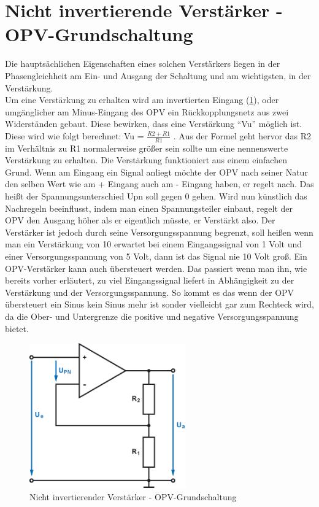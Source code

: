 \section{Nicht invertierende Verstärker - OPV-Grundschaltung}\label{sec:3.5}
Die hauptsächlichen Eigenschaften eines solchen Verstärkers liegen in der Phasengleichheit am Ein- und Ausgang der Schaltung und am wichtigsten, in der Verstärkung. \\
Um eine Verstärkung zu erhalten wird am invertierten Eingang (\ref{fig:3.5.1}), oder umgänglicher am Minus-Eingang des OPV ein Rückkopplungsnetz aus zwei Widerständen gebaut.
Diese bewirken, dass eine Verstärkung \enquote{Vu} möglich ist.
Diese wird wie folgt berechnet: Vu = $\frac{R2+R1}{R1}$ .
Aus der Formel geht hervor das R2 im Verhältnis zu R1 normalerweise größer sein sollte um eine nennenswerte Verstärkung zu erhalten.
Die Verstärkung funktioniert aus einem einfachen Grund.
Wenn am Eingang ein Signal anliegt möchte der OPV nach seiner Natur den selben Wert wie am + Eingang auch am - Eingang haben, er regelt nach.
Das heißt der Spannungsunterschied Upn soll gegen 0 gehen.
Wird nun künstlich das Nachregeln beeinflusst, indem man einen Spannungsteiler einbaut, regelt der OPV den Ausgang höher als er eigentlich müsste, er Verstärkt also.
Der Verstärker ist jedoch durch seine Versorgungsspannung begrenzt, soll heißen wenn man ein Verstärkung von 10 erwartet bei einem Eingangssignal von 1 Volt und einer Versorgungsspannung von 5 Volt, dann ist das Signal nie 10 Volt groß.
Ein OPV-Verstärker kann auch übersteuert werden.
Das passiert wenn man ihn, wie bereits vorher erläutert, zu viel Eingangssignal liefert in Abhängigkeit zu der Verstärkung und der Versorgungsspannung.
So kommt es das wenn der OPV übersteuert ein Sinus kein Sinus mehr ist sonder vielleicht gar zum Rechteck wird, da die Ober- und Untergrenze die positive und negative Versorgungsspannung bietet.
\begin{figure} [H]
	\centering	
	\includegraphics[width=0.6\textwidth]{img/Grundlagen/OPV-Verstaerker/OPV-VerstaerkerGrundschaltung.png}
	\caption[Nicht invertierender Verstärker - OPV-Grundschaltung]{Nicht invertierender Verstärker - OPV-Grundschaltung\footnotemark}
	\label {fig:3.5.1}
\end{figure}

